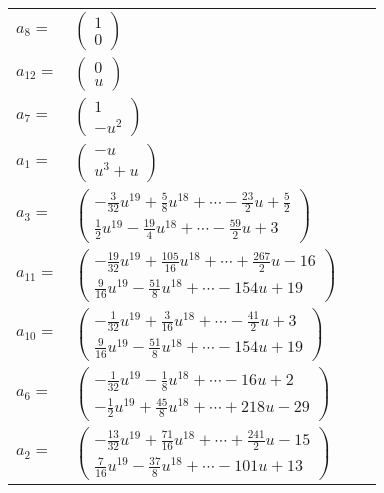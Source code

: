 \documentclass[1p]{elsarticle_modified}
\theoremstyle{definition}
\begin{document}
\begin{tabular}{m{7pt} m{180pt} m{7pt} m{180pt} }
\flushright $a_{8}=$&$\begin{pmatrix}1\\0\end{pmatrix}$ \\
\flushright $a_{12}=$&$\begin{pmatrix}0\\u\end{pmatrix}$ \\
\flushright $a_{7}=$&$\begin{pmatrix}1\\- u^2\end{pmatrix}$ \\
\flushright $a_{1}=$&$\begin{pmatrix}- u\\u^3+u\end{pmatrix}$ \\
\flushright $a_{3}=$&$\begin{pmatrix}-\frac{3}{32} u^{19}+\frac{5}{8} u^{18}+\cdots-\frac{23}{2} u+\frac{5}{2}\\\frac{1}{2} u^{19}-\frac{19}{4} u^{18}+\cdots-\frac{59}{2} u+3\end{pmatrix}$ \\
\flushright $a_{11}=$&$\begin{pmatrix}-\frac{19}{32} u^{19}+\frac{105}{16} u^{18}+\cdots+\frac{267}{2} u-16\\\frac{9}{16} u^{19}-\frac{51}{8} u^{18}+\cdots-154 u+19\end{pmatrix}$ \\
\flushright $a_{10}=$&$\begin{pmatrix}-\frac{1}{32} u^{19}+\frac{3}{16} u^{18}+\cdots-\frac{41}{2} u+3\\\frac{9}{16} u^{19}-\frac{51}{8} u^{18}+\cdots-154 u+19\end{pmatrix}$ \\
\flushright $a_{6}=$&$\begin{pmatrix}-\frac{1}{32} u^{19}-\frac{1}{8} u^{18}+\cdots-16 u+2\\-\frac{1}{2} u^{19}+\frac{45}{8} u^{18}+\cdots+218 u-29\end{pmatrix}$ \\
\flushright $a_{2}=$&$\begin{pmatrix}-\frac{13}{32} u^{19}+\frac{71}{16} u^{18}+\cdots+\frac{241}{2} u-15\\\frac{7}{16} u^{19}-\frac{37}{8} u^{18}+\cdots-101 u+13\end{pmatrix}$ \\

\end{tabular}
\end{document}
